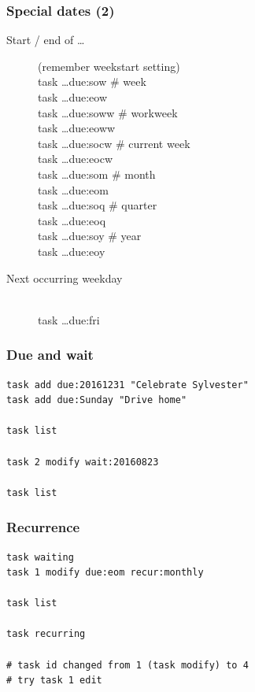 \documentclass[t,handout]{beamer}
\begin{document}
\begin{frame}[fragile]\frametitle{Special dates (2)}
    \begin{description}
        \item[Start / end of \ldots] (remember weekstart setting) \hfill \\
            task \ldots due:sow \# week \\
            task \ldots due:eow \\
            task \ldots due:soww \# workweek \\
            task \ldots due:eoww \\
            task \ldots due:socw \# current week \\
            task \ldots due:eocw \\
            task \ldots due:som \# month \\
            task \ldots due:eom \\
            task \ldots due:soq \# quarter \\
            task \ldots due:eoq \\
            task \ldots due:soy \# year \\
            task \ldots due:eoy \\
        \item[Next occurring weekday] \hfill \\
            task \ldots due:fri
    \end{description}
\end{frame}

\begin{frame}[fragile]\frametitle{Due and wait}
    \vfill
    \begin{lstlisting}
task add due:20161231 "Celebrate Sylvester"
task add due:Sunday "Drive home"

task list

task 2 modify wait:20160823

task list\end{lstlisting}
\end{frame}

\begin{frame}[fragile]\frametitle{Recurrence}
    \vfill
    \begin{lstlisting}
task waiting
task 1 modify due:eom recur:monthly

task list

task recurring

# task id changed from 1 (task modify) to 4
# try task 1 edit\end{lstlisting}
\end{frame}
\end{document}
